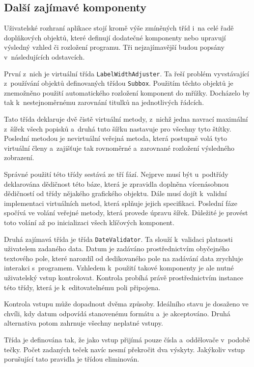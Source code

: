 		\subsection*{Další zajímavé komponenty}
		Uživatelské rozhraní aplikace stojí kromě výše zmíněných tříd i~na celé řadě doplňkových objektů, které definují dodatečné komponenty nebo upravují výsledný vzhled či rozložení programu. Tři nejzajímavější budou popsány v~následujících odstavcích.\par
		První z~nich je virtuální třída \texttt{LabelWidthAdjuster}. Ta řeší problém vyvstávající z~používání objektů definovaných třídou \texttt{Subbox}. Použitím těchto objektů je znemožněno použití automatického rozložení komponent do mřížky. Docházelo by tak k~nestejnoměrnému zarovnání titulků na jednotlivých řádcích.\par
		Tato třída deklaruje dvě čistě virtuální metody, z~nichž jedna navrací maximální z~šířek všech popisků a~druhá tuto šířku nastavuje pro všechny tyto štítky. Poslední metodou je nevirtuální veřejná metoda, která postupně volá tyto virtuální členy a~zajišťuje tak rovnoměrné a~zarovnané rozložení výsledného zobrazení.\par
		Správné použití této třídy sestává ze tří fází. Nejprve musí být u~podtřídy deklarována dědičnost této báze, která je zpravidla doplněna vícenásobnou dědičností od třídy nějakého grafického objektu. Dále musí dojít k~validní implementaci virtuálních metod, která splňuje jejich specifikaci. Poslední fáze spočívá ve volání veřejné metody, která provede úpravu šířek. Důležité je provést toto volání až po inicializaci všech klíčových komponent.\par
		Druhá zajímavá třída je třída \texttt{DateValidator}. Ta slouží k~validaci platnosti uživatelem zadaného data. Datum je zadáváno prostřednictvím obyčejného textového pole, které narozdíl od dedikovaného pole na zadávání data zrychluje interakci s~programem. Vzhledem k~použití takové komponenty je ale nutné uživatelský vstup kontrolovat. Kontrola probíhá právě prostřednictvím instance této třídy, která je k~editovatelnému poli připojena.\par
		Kontrola vstupu může dopadnout dvěma způsoby. Ideálního stavu je dosaženo ve chvíli, kdy datum odpovídá stanovenému formátu a~je akceptováno. Druhá alternativa potom zahrnuje všechny neplatné vstupy.\par
		Třída je definována tak, že jako vstup přijímá pouze čísla a~oddělovače v~podobě tečky. Počet zadaných teček navíc nesmí překročit dva výskyty. Jakýkoliv vstup porušující tato pravidla je třídou eliminován.\par
